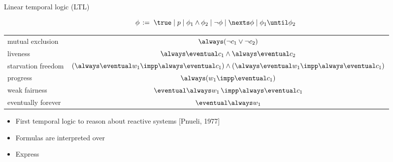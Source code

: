 \documentclass{beamer}
\begin{document}
\begin{slide}{Linear temporal logic (LTL)}\label{s:44}
\small

\[
\phi\, := \; \true \mid p \mid  \phi_1 \wedge \phi_2 \mid \neg \phi \mid \nexts \phi \mid  \phi_1 \until \phi_2
\]
\vspace{0.5cm}
\begin{center}
\begin{tabular}{|l|c|}
\hline
mutual exclusion  & $\always (\neg c_1 \vee \neg c_2)$ \\
 liveness & $\always \eventual c_1 \wedge \always \eventual c_2$\\
starvation freedom  & $(\always \eventual w_1 \impp \always \eventual c_1) \wedge
(\always \eventual w_1 \impp \always \eventual c_1)$ \\
progress & $\always (w_1 \impp \eventual c_1)$\\
weak fairness & $\eventual \always w_1 \, \impp \always \eventual c_1$\\
eventually forever & $\eventual \always w_1$\\
\hline
\end{tabular}  
\end{center}

\begin{itemize}
\item First temporal logic to reason about reactive systems [Pnueli, 1977]
\item Formulas are interpreted over 
\item Express 
\end{itemize}
\end{slide}
\end{document}
